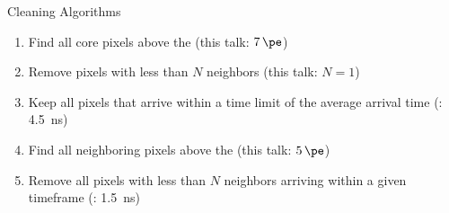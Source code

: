 \begin{frame}[t]{Cleaning Algorithms}
{\begin{overlayarea}{0.58\textwidth}{3.5cm}
{\begin{enumerate}
        \item \textcolor{white!50!black}{Find all core pixels above the  (this talk: \(\SI{7}{\pe}\))}
        \item \textcolor{white!50!black}{Remove pixels with less than \(N\) neighbors (this talk: \(N=1\))}
        \item \textcolor{white!50!black}{Keep all pixels that arrive within a time limit of the average arrival time (: \SI{4.5}{\nano\second})}
        \item \textcolor{white!50!black}{Find all neighboring pixels above the  (this talk: \(\SI{5}{\pe}\))}
        \item Remove all pixels with less than \(N\) neighbors arriving within a given timeframe (: \SI{1.5}{\nano\second})
      \end{enumerate}
      }
    \end{overlayarea}
    }
  \end{frame}